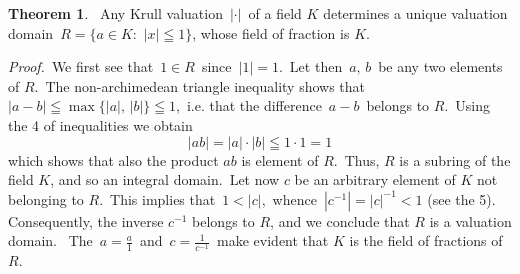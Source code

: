 \documentclass[12pt]{article}
\theoremstyle{definition}
\newtheorem*{thmplain}{Theorem}
\begin{document}
\begin{thmplain}
 \, Any Krull valuation \,$|\cdot|$\, of a field $K$ determines a unique valuation domain \,$R = \{a\in K: \,\,|x|\leqq 1\}$, whose field of fraction is $K$.
\end{thmplain}

{\em Proof.} \,We first see that \,$1\in R$\, since \,$|1| = 1$. \,Let then \,$a,\,b$\, be any two elements of $R$. \,The non-archimedean triangle inequality shows that \,$|a-b| \leqq \max\{|a|,\,|b|\} \leqq 1$, \,i.e. that the difference \,$a-b$\, belongs to $R$. \,Using the  4 of inequalities we obtain
       $$|ab| = |a|\cdot|b| \leqq 1\cdot 1 = 1$$
which shows that also the product $ab$ is element of $R$. \,Thus, $R$ is a subring of the field $K$, and so an integral domain. \,Let now $c$ be an arbitrary element of $K$ not belonging to $R$. \,This implies that \,$1 < |c|$, \,whence \,$|c^{-1}| = |c|^{-1} < 1$ (see the  5). \,Consequently, the inverse $c^{-1}$ belongs to $R$, and we conclude that $R$ is a valuation domain. \, The  \,$a = \frac{a}{1}$\, and \,$c = \frac{1}{c^{-1}}$\, make evident that $K$ is the field of fractions of $R$.
\end{document}
